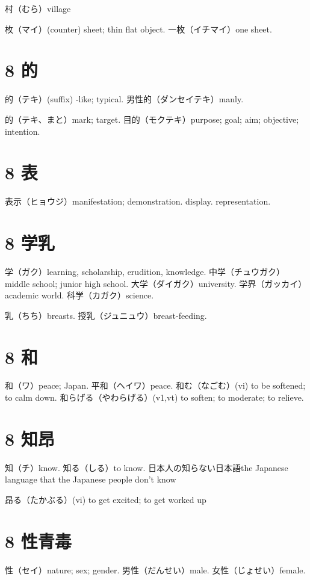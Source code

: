 村（むら）village

枚（マイ）(counter) sheet; thin flat object.
一枚（イチマイ）one sheet.

\section{8 的}

的（テキ）(suffix) -like; typical.
男性的（ダンセイテキ）manly.

的（テキ、まと）mark; target.
目的（モクテキ）purpose; goal; aim; objective; intention.

\section{8 表}

表示（ヒョウジ）manifestation; demonstration. display. representation.

\section{8 学乳}

学（ガク）learning, scholarship, erudition, knowledge.
中学（チュウガク）middle school; junior high school.
大学（ダイガク）university.
学界（ガッカイ）academic world.
科学（カガク）science.

乳（ちち）breasts.
授乳（ジュニュウ）breast-feeding.

\section{8 和}

和（ワ）peace; Japan.
平和（ヘイワ）peace.
和む（なごむ）(vi) to be softened; to calm down.
和らげる（やわらげる）(v1,vt) to soften; to moderate; to relieve.

\section{8 知昂}

知（チ）know.
知る（しる）to know.
日本人の知らない日本語the Japanese language that the Japanese people don't know

昂る（たかぶる）(vi) to get excited; to get worked up

\section{8 性青毒}

性（セイ）nature; sex; gender.
男性（だんせい）male.
女性（じょせい）female.

